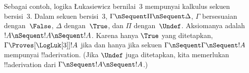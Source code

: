 \documentclass[../../../include/open-logic-section]{subfiles}
\begin{document}
Sebagai contoh, logika \L ukasiewicz bernilai~$3$ mempunyai kalkulus sekuen
bersisi~$3$. Dalam sekuen bersisi~$3$,
$\Gamma\nSequent\Pi\nSequent\Delta$, $\Gamma$ bersesuaian dengan~$\False$,
$\Delta$ dengan~$\True$, dan $\Pi$ dengan~$\Undef$. Aksiomanya adalah
$!A\nSequent !A\nSequent !A$. Karena hanya $\True$ yang ditetapkan,
$\Gamma\Proves[\LogLuk[3]]!A$ jika dan hanya jika sekuen
$\Gamma\nSequent\Gamma\nSequent !A$ mempunyai !!a{derivation}. (Jika
$\Undef$ juga ditetapkan, kita memerlukan !!a{derivation} dari
$\Gamma\nSequent !A\nSequent !A$.)
\end{document}
